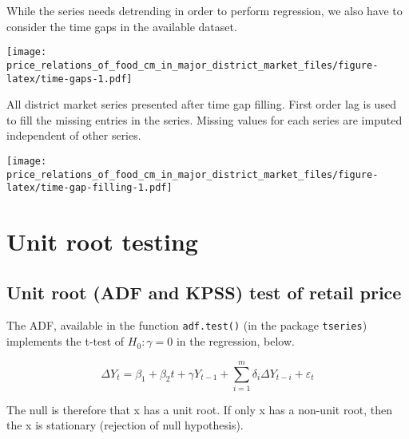 \documentclass[
  12pt,
]{article}
\begin{document}
While the series needs detrending in order to perform regression, we also have to consider the time gaps in the available dataset.

\texttt{[image: price\_relations\_of\_food\_cm\_in\_major\_district\_market\_files/figure-latex/time-gaps-1.pdf]}

All district market series presented after time gap filling. First order lag is used to fill the missing entries in the series. Missing values for each series are imputed independent of other series.

\texttt{[image: price\_relations\_of\_food\_cm\_in\_major\_district\_market\_files/figure-latex/time-gap-filling-1.pdf]}

\hypertarget{unit-root-testing}{%
\section{Unit root testing}\label{unit-root-testing}}

\hypertarget{unit-root-adf-and-kpss-test-of-retail-price}{%
\subsection{Unit root (ADF and KPSS) test of retail price}\label{unit-root-adf-and-kpss-test-of-retail-price}}

The ADF, available in the function \texttt{adf.test()} (in the package \texttt{tseries}) implements the t-test of \(H_0: \gamma = 0\) in the regression, below.

\begin{equation}
\label{eqn:lagged-ts-regression}
  \Delta {{Y}_{t}}={{\beta
  }_{1}}+{{\beta }_{2}}t+\gamma {{Y}_{t-1}}+ \sum\limits_{i=1}^{m}{\delta_i \Delta
    {{Y}_{t-i}}+{{\varepsilon }_{t}}}
\end{equation}

The null is therefore that x has a unit root. If only x has a non-unit root, then the x is stationary (rejection of null hypothesis).
\end{document}

